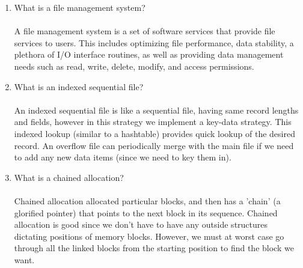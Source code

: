 \documentclass[12pt]{article}
\begin{document}
\begin{enumerate}
	\item What is a file management system?  \\ \\
	A file management system is a set of software services that provide file services to users. This includes optimizing file performance, data stability, a plethora of I/O interface routines, as well as providing data management needs such as read, write, delete, modify, and access permissions.\\
	
	\item What is an indexed sequential file? \\ \\
	An indexed sequential file is like a sequential file, having same record lengths and fields, however in this strategy we implement a key-data strategy. This indexed lookup (similar to a hashtable) provides quick lookup of the desired record. An overflow file can periodically merge with the main file if we need to add any new data items (since we need to key them in).\\
	
	\item What is a chained allocation? \\ \\
	Chained allocation allocated particular blocks, and then has a 'chain' (a glorified pointer) that points to the next block in its sequence. Chained allocation is good since we don't have to have any outside structures dictating positions of memory blocks. However, we must at worst case go through all the linked blocks from the starting position to find the block we want.
	
      
\end{enumerate}
\end{document}
